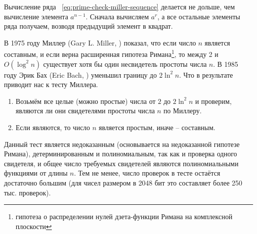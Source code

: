 Вычисление ряда ~\ref{eq:prime-check-miller-sequence} делается не дольше, чем вычисление элемента $a^{n-1}$. Сначала вычисляем $a^{r}$, а все остальные элементы ряда получаем, возводя предыдущий элемент в квадрат.

В 1975 году Миллер (Gary L. Miller, \cite{Miller:1975, Miller:1976}) показал, что если число $n$ является составным, и если верна расширенная гипотеза Римана\footnote{гипотеза о распределении нулей дзета-функции Римана на комплексной плоскости}, то между 2 и $O \left( \log^2 n \right)$ существует хотя бы один несвидетель простоты числа $n$. В 1985 году Эрик Бах (Eric Bach, \cite{Bach:1990}) уменьшил границу до $2 \ln^2 n$. Что в результате приводит нас к тесту Миллера.

\begin{enumerate}
	\item Возьмём все целые (можно простые) числа от $2$ до $2 \ln^2 n $ и проверим, являются ли они свидетелями простоты числа $n$ по Миллеру.
	\item Если являются, то число $n$ является простым, иначе -- составным.
\end{enumerate}

Данный тест является недоказанным (основывается на недоказанной гипотезе Римана), детерминированным и полиномиальным, так как и проверка одного свидетеля, и общее число требуемых свидетелей являются полиномиальными функциями от длины $n$. Тем не менее, число проверок в тесте остаётся достаточно большим (для чисел размером в 2048 бит это составляет более 250 тыс. проверок).
